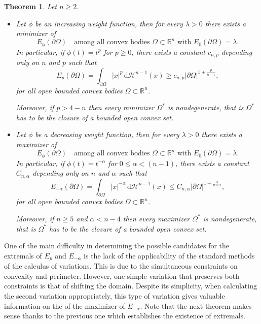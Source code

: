 \documentclass[10pt,leqno]{amsart}
\newcommand{\R}[0]{\mathbb{R}}
\newcommand{\p}{\partial}
\newcommand{\delomega}{\partial\Omega}
\newcommand{\dH}{\, \mathrm{d} \mathcal{H}^{n-1}}
\newtheorem{Theorem}{Theorem}
\numberwithin{Theorem}{section}
\theoremstyle{definition}
\theoremstyle{remark}
\numberwithin{equation}{section}
\numberwithin{equation}{section}
\begin{document}
\begin{Theorem}
\label{Thm:intro:existence1}
Let $n\geq 2$.
\begin{itemize}
    \item[(i)] Let $\phi$ be an increasing weight function, then for every $\lambda>0$ there  exists a minimizer of
\begin{equation} \label{min_problem_p_pos}
   E_\phi(\p \Omega)\quad\text{among all convex bodies $\Omega\subset\R^n$ with $E_0( \p \Omega)=\lambda$.}
\end{equation}
In particular, if $\phi(t)=t^{p}$ for $p\geq 0$, there exists a constant $c_{n,p}$ depending only on $n$ and $p$ such that
\begin{equation}
  \label{eq:gy:universal constant p pos}
   E_{p}(\delomega)= \int_{\delomega}|x|^p\dH(x)\geq c_{n,p} |\partial\Omega|^{1+\frac{p}{n-1}},
\end{equation}
for all open bounded convex bodies $\Omega\subset\R^n$.

Moreover, if  $p> 4-n$ then every minimizer $\Omega^*$ is nondegenerate, that is $\Omega^*$ has to be the closure of a bounded open convex set.

\bigskip


\item[(ii)] Let $\phi$ be a decreasing weight function, then for every $\lambda>0$ there  exists a maximizer of
\begin{equation} \label{max_problem_p_neg}
   E_\phi(\p \Omega)\quad\text{among all convex bodies $\Omega\subset\R^n$ with $E_0( \p \Omega)=\lambda$.}
\end{equation}
In particular, if $\phi(t)=t^{-\alpha}$ for $0\leq\alpha<(n-1)$, there exists a constant $C_{n,\alpha}$ depending only on $n$ and $\alpha$ such that
\begin{equation}
  \label{eq:gy:universal constant p neg}
  E_{-\alpha}(\delomega)=\int_{\delomega}|x|^{-\alpha}\dH(x)\leq C_{n,\alpha} |\partial\Omega|^{1-\frac{\alpha}{n-1}},
\end{equation}
for all open bounded convex bodies $\Omega\subset\R^n$.

Moreover,  if $n\geq 5$ and $\alpha < n-4$ then every maximizer  $\Omega^*$ is nondegenerate, that is $\Omega^*$ has to be the closure of a bounded open convex set.
\end{itemize}
\end{Theorem}




One of the main difficulty in determining the possible candidates for the extremals of $E_p$ and $E_{-\alpha}$ is the lack of the applicability of the standard methods of the calculus of variations. This is due to the simultaneous constraints on convexity and perimeter. However, one simple variation that preserves both constraints is that of shifting the domain. Despite its simplicity, when calculating the second variation appropriately, this type of variation gives valuable information on the  of the maximizer of $E_{-\alpha}$. Note that the next theorem makes sense thanks to the previous one which establishes the existence of extremals.
\end{document}
